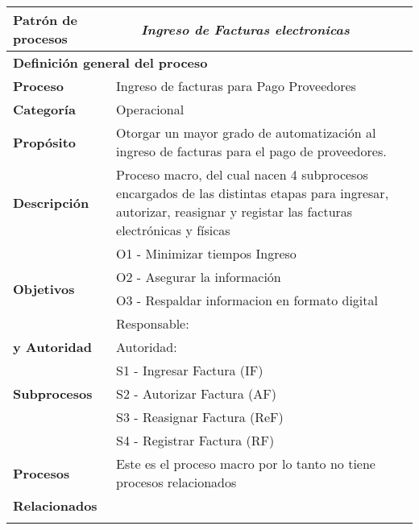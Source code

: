 \begin{longtable}{|llrrrrrr|}
	\hline
	\multicolumn{2}{|l|}{\textbf{Patrón de procesos}} & \multicolumn{6}{|l|}{\textit{Ingreso de Facturas electronicas}} \\ \hline
	\multicolumn{8}{|l|}{\textbf{Definición general del proceso}} \\ \hline
	\textbf{Proceso} & \multicolumn{7}{|m{12cm}|}{Ingreso de facturas para Pago Proveedores} \\ \hline
	\textbf{Categoría} & \multicolumn{7}{|m{12cm}|}{Operacional} \\ \hline
	\textbf{Propósito} & \multicolumn{7}{|m{12cm}|}{Otorgar un mayor grado de automatización al ingreso de facturas para el pago de proveedores.} \\ \hline
    \textbf{Descripción} & \multicolumn{7}{|m{12cm}|}{Proceso macro, del cual nacen 4 subprocesos encargados de las distintas etapas para ingresar, autorizar, reasignar y registar las facturas electrónicas y físicas} \\ \hline
	\multirow{4}[6]{*}{\textbf{Objetivos}} 
		  & \multicolumn{7}{|l|}{O1 - Minimizar tiempos Ingreso} \\ \cline{2-8}
          & \multicolumn{7}{|l|}{O2 - Asegurar la información} \\ \cline{2-8}
          & \multicolumn{7}{|l|}{O3 - Respaldar informacion en formato digital} \\ \hline
    \multicolumn{1}{|l|}{\textbf{Responsabilidad}} 	& \multicolumn{7}{|l|}{Responsable: } \\
	\multicolumn{1}{|l|}{\textbf{y Autoridad}} 	& \multicolumn{7}{|l|}{Autoridad: } \\ \hline
	\multirow{3}[4]{*}{\textbf{Subprocesos}} 
		  & \multicolumn{7}{|l|}{S1 - Ingresar Factura (IF)} \\  \cline{2-8} 
	      & \multicolumn{7}{|l|}{S2 - Autorizar Factura (AF)} \\  \cline{2-8} 
	      & \multicolumn{7}{|l|}{S3 - Reasignar Factura (ReF)} \\ \cline{2-8}
	      & \multicolumn{7}{|l|}{S4 - Registrar Factura (RF)} \\ \hline
    \multicolumn{1}{|l|}{\textbf{Procesos}} 	& \multicolumn{7}{|l|}{Este es el proceso macro por lo tanto no tiene procesos relacionados} \\
	\multicolumn{1}{|l|}{\textbf{Relacionados}} 	&  \multicolumn{7}{|l|}{} \\ \hline
          &       &       &       &       &       &       &  \\ \hline

\end{longtable}

